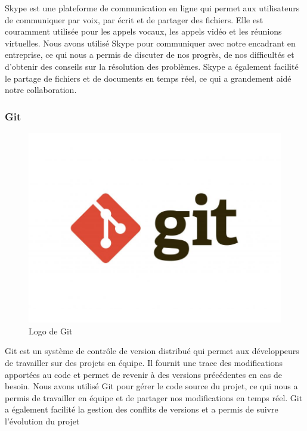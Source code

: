 Skype est une plateforme de communication en ligne qui permet aux utilisateurs de communiquer par voix, par écrit et de partager des fichiers. 
Elle est couramment utilisée pour les appels vocaux, les appels vidéo et les réunions virtuelles. Nous avons utilisé Skype pour communiquer 
avec notre encadrant en entreprise, ce qui nous a permis de discuter de nos progrès, de nos difficultés et d'obtenir des conseils sur 
la résolution des problèmes. Skype a également facilité le partage de fichiers et de documents en temps réel, ce qui a grandement aidé notre 
collaboration.

\subsubsection{Git}
\begin{figure}[h]
    \centering
    \includegraphics[scale=0.18]{Images/git.jpg} %
    \caption{Logo de Git\cite{git}}
    \label{fig:git}
    \end{figure}
Git est un système de contrôle de version distribué qui permet aux développeurs de travailler
sur des projets en équipe. Il fournit une trace des modifications apportées au code
et permet de revenir à des versions précédentes en cas de besoin. Nous avons utilisé
Git pour gérer le code source du projet, ce qui nous a permis de travailler en
équipe et de partager nos modifications en temps réel. Git a également facilité
la gestion des conflits de versions et a permis de suivre l'évolution du projet


